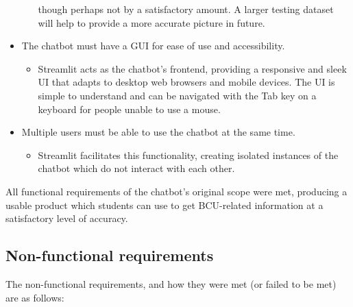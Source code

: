 \begin{itemize}
\begin{itemize}
        though perhaps not by a satisfactory amount. A larger testing dataset will help to provide a more accurate 
        picture in future.
    \end{itemize}
    \item The chatbot must have a GUI for ease of use and accessibility.
    \begin{itemize}
        \item Streamlit acts as the chatbot's frontend, providing a responsive and sleek UI that adapts to 
        desktop web browsers and mobile devices. The UI is simple to understand and can be navigated with the 
        Tab key on a keyboard for people unable to use a mouse.
    \end{itemize}
    \item Multiple users must be able to use the chatbot at the same time.
    \begin{itemize}
        \item Streamlit facilitates this functionality, creating isolated instances of the chatbot which do not interact 
        with each other.
    \end{itemize}
\end{itemize}

\noindent All functional requirements of the chatbot's original scope were met, producing a usable product which students 
can use to get BCU-related information at a satisfactory level of accuracy. 

\subsection{Non-functional requirements}
The non-functional requirements, and how they were met (or failed to be met) are as follows:

